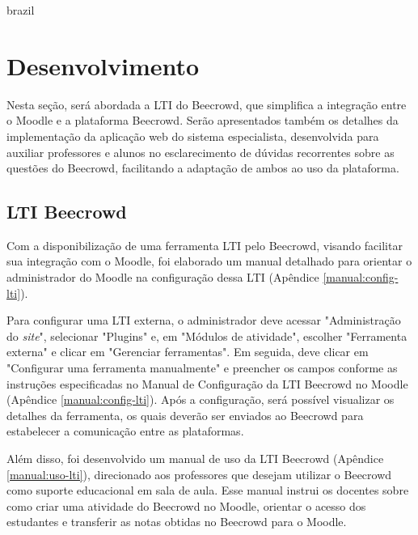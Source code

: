 

\begin{otherlanguage*}{brazil}

\chapter{Desenvolvimento}

Nesta seção, será abordada a LTI do Beecrowd, que simplifica a integração entre o Moodle e a plataforma Beecrowd. Serão apresentados também os detalhes da implementação da aplicação web do sistema especialista, desenvolvida para auxiliar professores e alunos no esclarecimento de dúvidas recorrentes sobre as questões do Beecrowd, facilitando a adaptação de ambos ao uso da plataforma.

\section{LTI Beecrowd}

Com a disponibilização de uma ferramenta LTI pelo Beecrowd, visando facilitar sua integração com o Moodle, foi elaborado um manual detalhado para orientar o administrador do Moodle na configuração dessa LTI (Apêndice \ref{manual:config-lti}).

Para configurar uma LTI externa, o administrador deve acessar "Administração do \textit{site}", selecionar "Plugins" e, em "Módulos de atividade", escolher "Ferramenta externa" e clicar em "Gerenciar ferramentas". Em seguida, deve clicar em "Configurar uma ferramenta manualmente" e preencher os campos conforme as instruções especificadas no Manual de Configuração da LTI Beecrowd no Moodle (Apêndice \ref{manual:config-lti}). Após a configuração, será possível visualizar os detalhes da ferramenta, os quais deverão ser enviados ao Beecrowd para estabelecer a comunicação entre as plataformas.

Além disso, foi desenvolvido um manual de uso da LTI Beecrowd (Apêndice \ref{manual:uso-lti}), direcionado aos professores que desejam utilizar o Beecrowd como suporte educacional em sala de aula. Esse manual instrui os docentes sobre como criar uma atividade do Beecrowd no Moodle, orientar o acesso dos estudantes e transferir as notas obtidas no Beecrowd para o Moodle.


\end{otherlanguage*}
